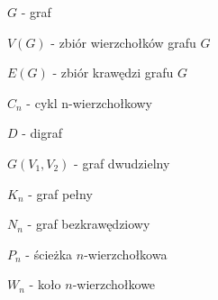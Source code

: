 $G$ - graf

$V(G)$ - zbiór wierzchołków grafu $G$

$E(G)$ - zbiór krawędzi grafu $G$

$C_n$ - cykl n-wierzchołkowy

$D$ - digraf

$G(V_1, V_2)$ - graf dwudzielny

$K_n$ - graf pełny

$N_n$ - graf bezkrawędziowy

$P_n$ - ścieżka $n$-wierzchołkowa

$W_n$ - koło $n$-wierzchołkowe